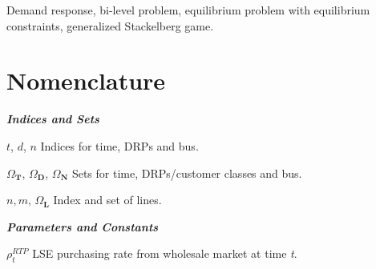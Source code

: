 \documentclass[journal]{IEEEtran}
\begin{document}
\begin{IEEEkeywords}
Demand response, bi-level problem, equilibrium problem with equilibrium constraints, generalized Stackelberg game.
\end{IEEEkeywords}


\makenomenclature
\section*{Nomenclature}
\begin{IEEEdescription}[\IEEEusemathlabelsep\IEEEsetlabelwidth{~~~~~~~~~~~~~}]
	\item[\textit{\textbf{Indices and Sets}}]
	\item[$t$, $d$, $n$]  Indices for time, DRPs and bus.
	\item[${\Omega_\textbf{T}}$, ${\Omega _\textbf{D}}$,  ${\Omega _\textbf{N}}$] Sets for time, DRPs/customer classes and bus.
    \item[$n, m$, ${\Omega _\textbf{L}}$] Index and set of lines.
			\item[\textit{\textbf{Parameters and Constants}}]
	\item[$\rho _t^{RTP}$]  LSE purchasing rate from wholesale market at time \textit{t}.

\end{IEEEdescription}
\end{document}
